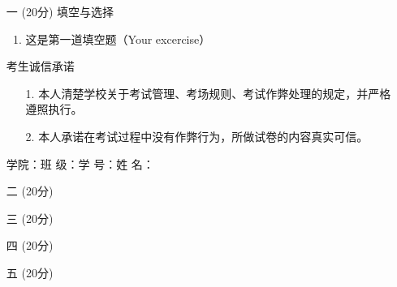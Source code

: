 \documentclass[a4paper,12pt,twoside]{article}
\begin{document}
  \begin{enumerate}
  \item [一] (20分) 填空与选择
    \begin{enumerate}
    \item 这是第一道填空题（Your excercise）
    \end{enumerate}
    
    \vspace{2in}
    \newpage \thispagestyle{plain}

      { %
      
      \begin{center}
        考生诚信承诺
      \end{center}
      {\small
        \begin{enumerate}
        \item [1.] 本人清楚学校关于考试管理、考场规则、考试作弊处理的规定，并严格
          遵照执行。
        \item [2.] 本人承诺在考试过程中没有作弊行为，所做试卷的内容真实可信。
        \end{enumerate}}学院：\underline{\quad\quad\quad\quad\quad}班
      级：\underline{\quad\quad\quad\quad}学
      号：\underline{\quad\quad\quad\quad\quad}姓
      名：\underline{\quad\quad\quad\quad}
      
    }

  \item [二] (20分) 
    \begin{enumerate}
    \end{enumerate}
    \vspace{2in}
    
    \newpage
  \item [三] (20分)
    \begin{enumerate}
    \end{enumerate}

    \vspace{2in}

    \newpage

  \item [四] (20分)
    \begin{enumerate}

    \end{enumerate}

    \vspace{2in}

    \newpage    
  \item [五] (20分) 
    \begin{enumerate}

    \end{enumerate}

    \vspace{2in}

  \end{enumerate}
\end{document}
